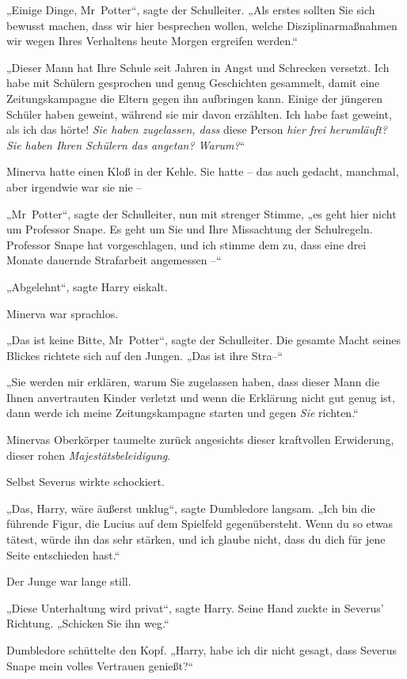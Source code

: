{„Einige Dinge, Mr~Potter“, sagte der Schulleiter. „Als erstes sollten Sie sich bewusst machen, dass wir hier besprechen wollen, welche Disziplinarmaßnahmen wir wegen Ihres Verhaltens heute Morgen ergreifen werden.“

„Dieser Mann hat Ihre Schule seit Jahren in Angst und Schrecken versetzt. Ich habe mit Schülern gesprochen und genug Geschichten gesammelt, damit eine Zeitungskampagne die Eltern gegen ihn aufbringen kann. Einige der jüngeren Schüler haben geweint, während sie mir davon erzählten. Ich habe fast geweint, als ich das hörte! \emph{Sie haben zugelassen, dass} diese Person \emph{hier frei herumläuft? Sie haben Ihren Schülern das angetan? Warum?}“

Minerva hatte einen Kloß in der Kehle. Sie hatte -- das auch gedacht, manchmal, aber irgendwie war sie nie --

„Mr~Potter“, sagte der Schulleiter, nun mit strenger Stimme, „es geht hier nicht um Professor Snape. Es geht um Sie und Ihre Missachtung der Schulregeln. Professor Snape hat vorgeschlagen, und ich stimme dem zu, dass eine drei Monate dauernde Strafarbeit angemessen --“

„Abgelehnt“, sagte Harry eiskalt.

Minerva war sprachlos.

„Das ist keine Bitte, Mr~Potter“, sagte der Schulleiter. Die gesamte Macht seines Blickes richtete sich auf den Jungen. „Das ist ihre Stra--“

„Sie werden mir erklären, warum Sie zugelassen haben, dass dieser Mann die Ihnen anvertrauten Kinder verletzt und wenn die Erklärung nicht gut genug ist, dann werde ich meine Zeitungskampagne starten und gegen \emph{Sie} richten.“

Minervas Oberkörper taumelte zurück angesichts dieser kraftvollen Erwiderung, dieser rohen \emph{Majestätsbeleidigung}.

Selbst Severus wirkte schockiert.

„Das, Harry, wäre äußerst unklug“, sagte Dumbledore langsam. „Ich bin die führende Figur, die Lucius auf dem Spielfeld gegenübersteht. Wenn du so etwas tätest, würde ihn das sehr stärken, und ich glaube nicht, dass du dich für jene Seite entschieden hast.“

Der Junge war lange still.

„Diese Unterhaltung wird privat“, sagte Harry. Seine Hand zuckte in Severus' Richtung. „Schicken Sie ihn weg.“

Dumbledore schüttelte den Kopf. „Harry, habe ich dir nicht gesagt, dass Severus Snape mein volles Vertrauen genießt?“

}
